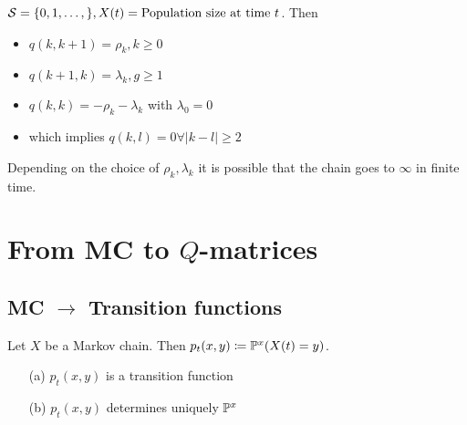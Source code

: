 \begin{example*}
    \(\mathcal{S}=\{0,1,\dots,\},X(t)=\text{Population size at time } t\). Then 
    \begin{itemize}
        \item \(q(k,k+1)=\rho_k, k\geq 0\)
        \item  \(q(k+1,k)=\lambda_k,g\geq 1\)
        \item \(q(k,k)=-\rho_k-\lambda_k\) with \(\lambda_0=0\)
        \item which implies \(q(k,l)=0\forall |k-l|\geq 2\)
    \end{itemize}
    Depending on the choice of \(\rho_k,\lambda_k\) it is possible that the chain goes to \(\infty\) in finite time.
\end{example*}

\section{From MC to \(Q\)-matrices}

\subsection{MC \(\to\) Transition functions}
\begin{theorem}\label{thm:1.5}
    Let \(X\) be a Markov chain. Then \(p_t(x,y)\coloneqq\mathbb{P}^x(X(t)=y)\).
    \begin{enumerate}
        \item[(a)] \(p_t(x,y)\) is a transition function 
        \item[(b)]\(p_t(x,y)\) determines uniquely \(\mathbb{P}^x\)  
    \end{enumerate}
\end{theorem}

